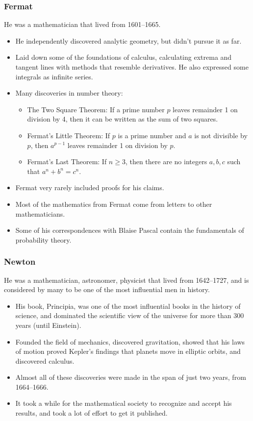 \documentclass[class=article, crop=false]{standalone}
\begin{document}
  \subsubsection{Fermat}
  He was a mathematician that lived from 1601--1665.
  \begin{itemize}
    \item He independently discovered analytic geometry, but didn't pursue it as far.
    \item Laid down some of the foundations of calculus, calculating extrema and tangent lines with methods that resemble derivatives. He also expressed some integrals as infinite series.
    \item Many discoveries in number theory:
    \begin{itemize}
      \item The Two Square Theorem: If a prime number $p$ leaves remainder 1 on division by 4, then it can be written as the sum of two squares.
      \item Fermat's Little Theorem: If $p$ is a prime number and $a$ is not divisible by $p$, then $a^{p - 1}$ leaves remainder 1 on division by $p$.
      \item Fermat's Last Theorem: If $n \geq 3$, then there are no integers $a, b, c$ such that $a^n + b^n = c^n$.
    \end{itemize}
    \item Fermat very rarely included proofs for his claims.
    \item Most of the mathematics from Fermat come from letters to other mathematicians.
    \item Some of his correspondences with Blaise Pascal contain the fundamentals of probability theory.
  \end{itemize}
  \subsubsection{Newton}
  He was a mathematician, astronomer, physicist that lived from 1642--1727, and is considered by many to be one of the most influential men in history.
  \begin{itemize}
    \item His book, Principia, was one of the most influential books in the history of science, and dominated the scientific view of the universe for more than 300 years (until Einstein).
    \item Founded the field of mechanics, discovered gravitation, showed that his laws of motion proved Kepler's findings that planets move in elliptic orbits, and discovered calculus.
    \item Almost all of these discoveries were made in the span of just two years, from 1664--1666.
    \item It took a while for the mathematical society to recognize and accept his results, and took a lot of effort to get it published.
  \end{itemize}
\end{document}
